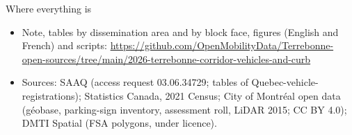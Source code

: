 \documentclass[aspectratio=169,10pt]{beamer}\usetheme{default}\usecolortheme{seahorse}\setbeamertemplate{navigation symbols}{}\setbeamertemplate{footline}[frame number]
\begin{document}
\begin{frame}{Where everything is}
\begin{itemize}
\item Note, tables by dissemination area and by block face, figures (English and French) and scripts: \url{https://github.com/OpenMobilityData/Terrebonne-open-sources/tree/main/2026-terrebonne-corridor-vehicles-and-curb}
\item Sources: SAAQ (access request 03.06.34729; tables of Quebec-vehicle-registrations); Statistics Canada, 2021 Census; City of Montréal open data (géobase, parking-sign inventory, assessment roll, LiDAR 2015; CC BY 4.0); DMTI Spatial (FSA polygons, under licence).
\end{itemize}
\end{frame}
\end{document}
